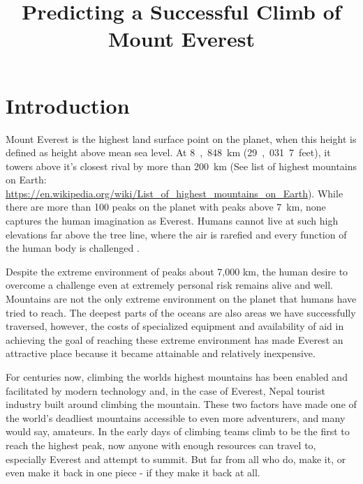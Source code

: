 \documentclass[stu,12pt,floatsintext]{apa7}
\title{Predicting a Successful Climb of Mount Everest} %
\affiliation{University of San Diego}
\begin{document}
\maketitle %


\section{Introduction}
Mount Everest is the highest land surface point on the planet, when this height is defined as height above mean sea level. At \si{8,848~\km} (\si{29,031.7~feet}), it towers above it's closest rival by more than \si{200~\km} (See list of highest mountains on Earth: \url{https://en.wikipedia.org/wiki/List_of_highest_mountains_on_Earth}). While there are more than 100 peaks on the planet with peaks above \si{7~\km}, none captures the human imagination as Everest. Humans cannot live at such high elevations far above the tree line, where the air is rarefied and every function of the human body is challenged \cite{goos_how_2018}.

Despite the extreme environment of peaks about 7,000 km, the human desire to overcome a challenge even at extremely personal risk remains alive and well. Mountains are not the only extreme environment on the planet that humans have tried to reach. The deepest parts of the oceans are also areas we have successfully traversed, however, the costs of specialized equipment and availability of aid in achieving the goal of reaching these extreme environment has made Everest an attractive place because it became attainable and relatively inexpensive.

For centuries now, climbing the worlds highest mountains has been enabled and facilitated by modern technology and, in the case of Everest, Nepal tourist industry built around climbing the mountain. These two factors have made one of the world's deadliest mountains accessible to even more adventurers, and many would say, amateurs. In the early days of climbing teams climb to be the first to reach the highest peak, now anyone with enough resources can travel to, especially Everest and attempt to summit. But far from all who do, make it, or even make it back in one piece - if they make it back at all.
\end{document}
